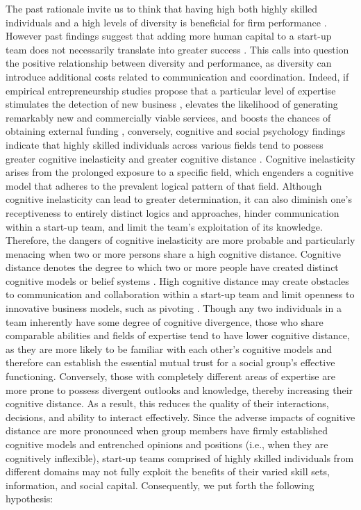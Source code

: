 \documentclass[12pt]{article}
\begin{document}
The past rationale invite us to think that having high both highly skilled individuals and a high levels of diversity is beneficial for firm performance \citep{diaz2020top}. However past findings suggest that adding more human capital to a start-up team does not necessarily translate into greater success \citep{pierce2013too, sundermeier2022entrepreneurial}. This calls into question the positive relationship between diversity and performance, as diversity can introduce additional costs related to communication and coordination. Indeed, if empirical entrepreneurship studies propose that a particular level of expertise stimulates the detection of new business \citep{shane2000promise, marvel2016human}, elevates the likelihood of generating remarkably new and commercially viable services, and boosts the chances of obtaining external funding \citep{beckman2007early, marvel2007technology}, conversely, cognitive and social psychology findings indicate that highly skilled individuals across various fields tend to possess greater cognitive inelasticity and greater cognitive distance \citep{nooteboom2007optimal}. Cognitive inelasticity arises from the prolonged exposure to a specific field, which engenders a cognitive model that adheres to the prevalent logical pattern of that field. Although cognitive inelasticity can lead to greater determination, it can also diminish one's receptiveness to entirely distinct logics and approaches, hinder communication within a start-up team, and limit the team's exploitation of its knowledge. Therefore, the dangers of cognitive inelasticity are more probable and particularly menacing when two or more persons share a high cognitive distance. Cognitive distance denotes the degree to which two or more people have created distinct cognitive models or belief systems \citep{nooteboom2007optimal}. High cognitive distance may create obstacles to communication and collaboration within a start-up team and limit openness to innovative business models, such as pivoting \citep{kirtley2020pivot}. Though any two individuals in a team inherently have some degree of cognitive divergence, those who share comparable abilities and fields of expertise tend to have lower cognitive distance, as they are more likely to be familiar with each other's cognitive models and therefore can establish the essential mutual trust for a social group's effective functioning. Conversely, those with completely different areas of expertise are more prone to possess divergent outlooks and knowledge, thereby increasing their cognitive distance. As a result, this reduces the quality of their interactions, decisions, and ability to interact effectively. Since the adverse impacts of cognitive distance are more pronounced when group members have firmly established cognitive models and entrenched opinions and positions (i.e., when they are cognitively inflexible), start-up teams comprised of highly skilled individuals from different domains may not fully exploit the benefits of their varied skill sets, information, and social capital. Consequently, we put forth the following hypothesis: \\
\end{document}

